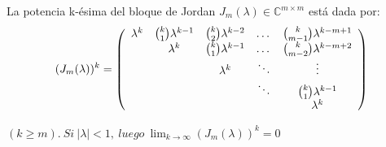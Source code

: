 \documentclass{article}
\begin{document}
La potencia k-ésima del bloque de Jordan $J_{m}(\lambda) \in \mathbb{C}^{m\times m}$ está dada por:\\
$$(J_{m}(\lambda))^{k}= \left(\begin{array}{c c c c c}
    \lambda^{k} & {k \choose 1}\lambda^{k-1}   & {k \choose 2}\lambda^{k-2} & \dots       & {k \choose m-1}\lambda^{k-m+1}\\
                  & \lambda^{k}                &  {k \choose 1}\lambda^{k-1} & \dots       & {k \choose m-2}\lambda^{k-m+2}\\
                  &                            &  \lambda^{k}                & 	\ddots     &  \vdots\\
                  &                            &                             & 	\ddots     & {k \choose 1}\lambda^{k-1}\\
                  &                            &                             &             & \lambda^{k}
\end{array}\right)$$

$(k\geq m).\ Si \ |\lambda| < 1, \ luego \ \lim_{k\rightarrow\infty}(J_{m}(\lambda))^{k} = 0$
\end{document}
